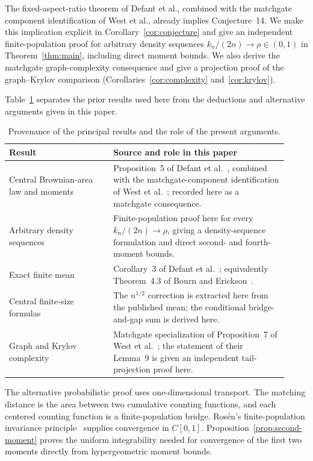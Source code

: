 \documentclass[twoside,10pt]{article}
\numberwithin{equation}{section}
\theoremstyle{slbody}
\theoremstyle{definition}
\theoremstyle{remark}
\newcommand{\1}{\mathbf{1}}
\begin{document}
The fixed-aspect-ratio theorem of Defant et al., combined with the matchgate
component identification of West et al., already implies Conjecture~14.
We make this implication explicit in Corollary~\ref{cor:conjecture} and give
an independent finite-population proof for arbitrary density sequences
$k_n/(2n)\to\rho\in(0,1)$ in Theorem~\ref{thm:main}, including direct moment
bounds.  We also derive the matchgate graph-complexity consequence and give a
projection proof of the graph--Krylov comparison
(Corollaries~\ref{cor:complexity} and~\ref{cor:krylov}).

Table~\ref{tab:provenance} separates the prior results used here from the
deductions and alternative arguments given in this paper.

\begin{table}[htbp]
\centering
\small
\begin{tabular}{>{\raggedright\arraybackslash}p{0.34\linewidth}
                >{\raggedright\arraybackslash}p{0.58\linewidth}}
Result & Source and role in this paper\\
\hline
Central Brownian-area law and moments
& Proposition~5 of Defant et al.~\cite[Proposition~5]{DefantEtAl}, combined
with the matchgate-component identification of West et
al.~\cite[Section~IV and Appendix~C]{WestEtAl}; recorded here as a matchgate
consequence.\\
Arbitrary density sequences
& Finite-population proof here for every $k_n/(2n)\to\rho$, giving a
density-sequence formulation and direct second- and fourth-moment bounds.\\
Exact finite mean
& Corollary~3 of Defant et al.~\cite[Corollary~3]{DefantEtAl}; equivalently
Theorem~4.3 of Bourn and Erickson~\cite[Theorem~4.3]{BournErickson}.\\
Central finite-size formulas
& The $n^{1/2}$ correction is extracted here from the published mean; the
conditional bridge-and-gap sum is derived here.\\
Graph and Krylov complexity
& Matchgate specialization of Proposition~7 of West et
al.~\cite[Proposition~7 and Lemma~9]{WestEtAl}; the statement of their
Lemma~9 is given an independent tail-projection proof here.\\
\end{tabular}
\caption{Provenance of the principal results and the role of the present
arguments.}
\label{tab:provenance}
\end{table}

The alternative probabilistic proof uses one-dimensional transport.  The
matching distance is the area between two cumulative counting functions, and
each centered counting function is a finite-population bridge.  Ros\'en's
finite-population invariance principle~\cite[Theorem~13.1]{Rosen} supplies
convergence in $C[0,1]$.  Proposition~\ref{prop:second-moment} proves the
uniform integrability needed for convergence of the first two moments directly
from hypergeometric moment bounds.
\end{document}
